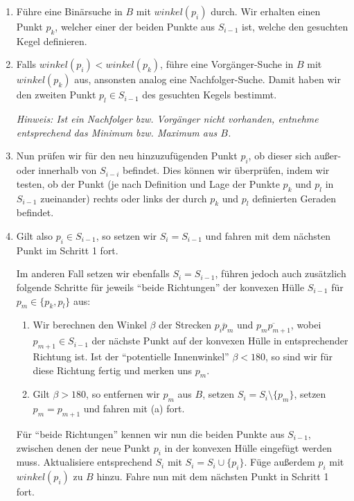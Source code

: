\documentclass[a4paper]{article}
\begin{document}
\begin{enumerate}
 \item Führe eine Binärsuche in $B$ mit $winkel(p_i)$ durch. Wir erhalten einen Punkt $p_k$, welcher einer der beiden Punkte
 aus $S_{i-1}$ ist, welche den gesuchten Kegel definieren.
 \item Falls $winkel(p_i) < winkel(p_k)$, führe eine Vorgänger-Suche in $B$ mit $winkel(p_k)$ aus, ansonsten analog eine Nachfolger-Suche.
 Damit haben wir den zweiten Punkt $p_l \in S_{i-1}$ des gesuchten Kegels bestimmt. 
 
 \textit{Hinweis: Ist ein Nachfolger bzw. Vorgänger nicht vorhanden, entnehme entsprechend das Minimum bzw. Maximum aus $B$.}
 \item Nun prüfen wir für den neu hinzuzufügenden Punkt $p_i$, ob dieser sich außer- oder innerhalb von $S_{i-i}$ befindet. 
 Dies können wir überprüfen, indem wir testen, ob der Punkt (je nach Definition und Lage der Punkte $p_k$ und $p_l$ in $S_{i-1}$ zueinander) rechts oder links der durch $p_k$ und $p_l$ definierten Geraden befindet. 
 \item Gilt also $p_i \in S_{i-1}$, so setzen wir $S_i = S_{i-1}$ und fahren mit dem nächsten Punkt im Schritt 1 fort. 
 
 Im anderen Fall setzen wir ebenfalls $S_i = S_{i-1}$, führen jedoch auch zusätzlich folgende Schritte für jeweils "`beide Richtungen"' der konvexen Hülle $S_{i-1}$ für $p_m \in \{p_k, p_l\}$  aus:
 \begin{enumerate}
  \item Wir berechnen den Winkel $\beta$ der Strecken $\overline{p_i p_m}$ und $\overline{p_m p_{m+1}}$, wobei $p_{m+1} \in S_{i-1}$ der nächste Punkt auf der konvexen
  Hülle in entsprechender Richtung ist. Ist der "`potentielle Innenwinkel"' $\beta < 180$\textdegree, so sind wir für diese Richtung fertig
  und merken uns $p_m$.
  \item Gilt $\beta > 180$\textdegree, so entfernen wir $p_m$ aus $B$, setzen $S_i = S_i \setminus \{p_m\}$, setzen $p_m = p_{m+1}$ und fahren mit (a) fort.
 \end{enumerate}

 Für "`beide Richtungen"' kennen wir nun die beiden Punkte aus $S_{i-1}$, zwischen denen der neue Punkt $p_i$ in der konvexen Hülle
 eingefügt werden muss. Aktualisiere entsprechend $S_i$ mit $S_i = S_i \cup \{p_i\}$. 
 Füge außerdem $p_i$ mit $winkel(p_i)$ zu $B$ hinzu.
 Fahre nun mit dem nächsten Punkt in Schritt 1 fort.
\end{enumerate}
\end{document}
